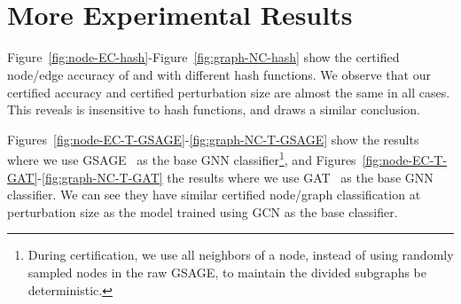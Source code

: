 \begin{figure*}[!t]
\centering
{}\hfill
{}\hfill
{}\hfill
{}\\
\vspace{-2mm}
\caption{Certified graph accuracy of our {\nameE} w.r.t. the hash function $h$.}
\label{fig:graph-EC-hash}
\vspace{-6mm}
\end{figure*}

\begin{figure*}[!t]
\centering
{}\hfill
{}\hfill
{}\hfill
{}\\
\vspace{-2mm}
\caption{Certified graph accuracy of our {\nameN} w.r.t. the hash function $h$.}
\label{fig:graph-NC-hash}
\vspace{-4mm}
\end{figure*}




\section{More Experimental Results}


\vspace{+0.05in}
\noindent 
Figure~\ref{fig:node-EC-hash}-Figure~\ref{fig:graph-NC-hash} show the certified node/edge accuracy of {\nameE} and  {\nameN} with different hash functions. 
We observe that our certified accuracy and certified perturbation size are almost the same in all cases. This reveals  {\name} is insensitive to hash functions, and \cite{xia2024gnncert} draws a similar conclusion. 

\vspace{+0.05in}
\noindent  Figures~\ref{fig:node-EC-T-GSAGE}-\ref{fig:graph-NC-T-GSAGE} show the results where we use GSAGE~\cite{hamilton2017inductive} as the base GNN classifier\footnote{During certification, we use all neighbors of a node,  instead of using randomly sampled nodes in the raw GSAGE, to maintain the divided subgraphs be deterministic.}, and Figures~\ref{fig:node-EC-T-GAT}-\ref{fig:graph-NC-T-GAT} the results where we use GAT~\cite{velivckovic2018graph} as the base GNN classifier. We can see they have similar certified node/graph classification at perturbation size as the model trained using GCN as the base classifier. %

